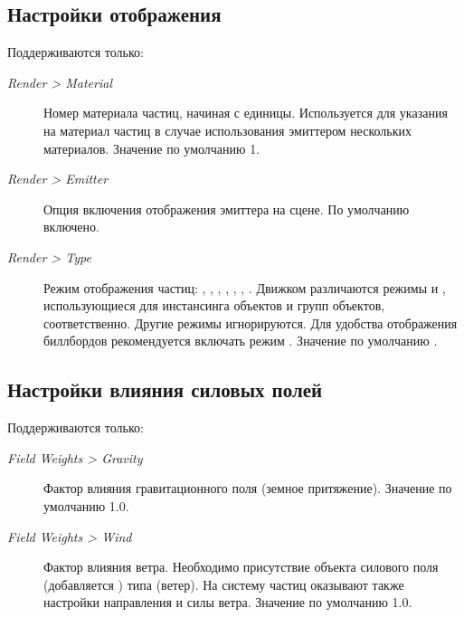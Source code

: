 \documentclass[a4paper,12pt,oneside]{sphinxmanual}
\begin{document}
\subsection{Настройки отображения}
\label{particles:id11}
Поддерживаются только:
\begin{description}
\item[{\emph{Render \textgreater{} Material}}] \leavevmode
Номер материала частиц, начиная с единицы. Используется для указания на материал частиц в случае использования эмиттером нескольких материалов. Значение по умолчанию 1.

\item[{\emph{Render \textgreater{} Emitter}}] \leavevmode
Опция включения отображения эмиттера на сцене. По умолчанию включено.

\item[{\emph{Render \textgreater{} Type}}] \leavevmode
Режим отображения частиц: , , , , , , . Движком различаются режимы  и , использующиеся для инстансинга объектов и групп объектов, соответственно. Другие режимы игнорируются. Для удобства отображения биллбордов рекомендуется включать режим . Значение по умолчанию .

\end{description}


\subsection{Настройки влияния силовых полей}
\label{particles:id12}\label{particles:particles-force-fields}
Поддерживаются только:
\begin{description}
\item[{\emph{Field Weights \textgreater{} Gravity}}] \leavevmode
Фактор влияния гравитационного поля (земное притяжение). Значение по умолчанию 1.0.

\item[{\emph{Field Weights \textgreater{} Wind}}] \leavevmode
Фактор влияния ветра. Необходимо присутствие объекта силового поля (добавляется ) типа  (ветер). На систему частиц оказывают также настройки направления и силы ветра. Значение по умолчанию 1.0.

\end{description}
\end{document}
